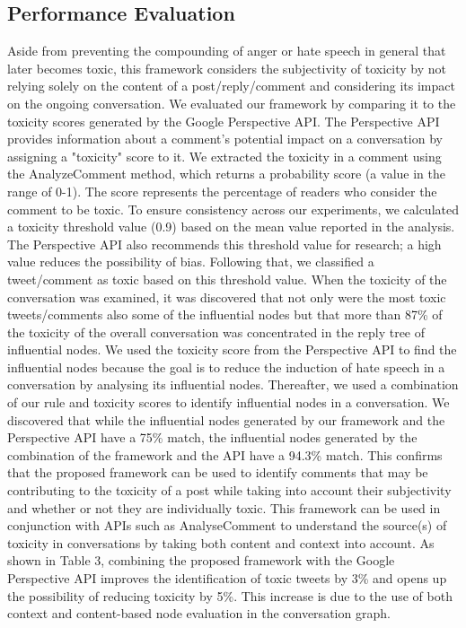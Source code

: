 \documentclass[acmtog]{acmart}
\begin{document}
\subsection{Performance Evaluation}
Aside from preventing the compounding of anger or hate speech in general that later becomes toxic, this framework considers the subjectivity of toxicity by not relying solely on the content of a post/reply/comment and considering its impact on the ongoing conversation. We evaluated our framework by comparing it to the toxicity scores generated by the Google Perspective API. The Perspective API provides information about a comment's potential impact on a conversation by assigning a "toxicity" score to it. We extracted the toxicity in a comment using the AnalyzeComment method, which returns a probability score (a value in the range of 0-1). The score represents the percentage of readers who consider the comment to be toxic. To ensure consistency across our experiments, we calculated a toxicity threshold value (0.9) based on the mean value reported in the analysis. The Perspective API also recommends this threshold value for research; a high value reduces the possibility of bias. Following that, we classified a tweet/comment as toxic based on this threshold value. When the toxicity of the conversation was examined, it was discovered that not only were the most toxic tweets/comments also some of the influential nodes but that more than 87\% of the toxicity of the overall conversation was concentrated in the reply tree of influential nodes. We used the toxicity score from the Perspective API to find the influential nodes because the goal is to reduce the induction of hate speech in a conversation by analysing its influential nodes. Thereafter, we used a combination of our rule and toxicity scores to identify influential nodes in a conversation. We discovered that while the influential nodes generated by our framework and the Perspective API have a 75\% match, the influential nodes generated by the combination of the framework and the API have a 94.3\% match. This confirms that the proposed framework can be used to identify comments that may be contributing to the toxicity of a post while taking into account their subjectivity and whether or not they are individually toxic. This framework can be used in conjunction with APIs such as AnalyseComment to understand the source(s) of toxicity in conversations by taking both content and context into account. As shown in Table 3, combining the proposed framework with the Google Perspective API improves the identification of toxic tweets by 3\% and opens up the possibility of reducing toxicity by 5\%. This increase is due to the use of both context and content-based node evaluation in the conversation graph.
\end{document}
